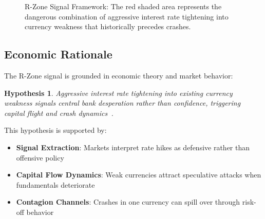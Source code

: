 \documentclass[twocolumn,ieee]{arithmaxresearch}
\newtheorem{hypothesis}{Hypothesis}[section]
\begin{document}
\begin{figure}[h]
\centering
{}
\caption{R-Zone Signal Framework: The red shaded area represents the dangerous combination of aggressive interest rate tightening into currency weakness that historically precedes crashes.}
\label{fig:r_zone_framework}
\end{figure}

\subsection{Economic Rationale}

The R-Zone signal is grounded in economic theory and market behavior:

\begin{hypothesis}
Aggressive interest rate tightening into existing currency weakness signals central bank desperation rather than confidence, triggering capital flight and crash dynamics~\cite{calvo2001capital}.
\end{hypothesis}

This hypothesis is supported by:
\begin{itemize}
    \item \textbf{Signal Extraction}: Markets interpret rate hikes as defensive rather than offensive policy~\cite{bernanke2005monetary}
    \item \textbf{Capital Flow Dynamics}: Weak currencies attract speculative attacks when fundamentals deteriorate~\cite{obstfeld1996models}
    \item \textbf{Contagion Channels}: Crashes in one currency can spill over through risk-off behavior~\cite{forbes2002crash}
\end{itemize}
\end{document}
